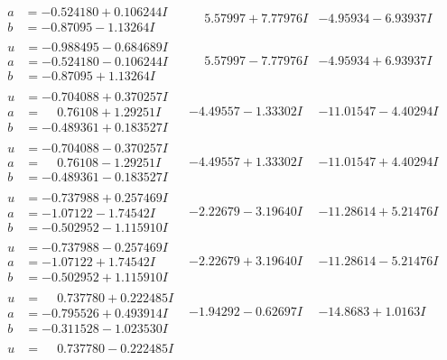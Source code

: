 \documentclass[1p]{elsarticle_modified}
\theoremstyle{definition}
\begin{document}
$$\begin{array}{c|c|c}
\begin{aligned}
a &= -0.524180 + 0.106244 I \\
b &= -0.87095 - 1.13264 I\end{aligned}
 & \phantom{-}5.57997 + 7.77976 I & -4.95934 - 6.93937 I \\ \hline\begin{aligned}
u &= -0.988495 - 0.684689 I \\
a &= -0.524180 - 0.106244 I \\
b &= -0.87095 + 1.13264 I\end{aligned}
 & \phantom{-}5.57997 - 7.77976 I & -4.95934 + 6.93937 I \\ \hline\begin{aligned}
u &= -0.704088 + 0.370257 I \\
a &= \phantom{-}0.76108 + 1.29251 I \\
b &= -0.489361 + 0.183527 I\end{aligned}
 & -4.49557 - 1.33302 I & -11.01547 - 4.40294 I \\ \hline\begin{aligned}
u &= -0.704088 - 0.370257 I \\
a &= \phantom{-}0.76108 - 1.29251 I \\
b &= -0.489361 - 0.183527 I\end{aligned}
 & -4.49557 + 1.33302 I & -11.01547 + 4.40294 I \\ \hline\begin{aligned}
u &= -0.737988 + 0.257469 I \\
a &= -1.07122 - 1.74542 I \\
b &= -0.502952 - 1.115910 I\end{aligned}
 & -2.22679 - 3.19640 I & -11.28614 + 5.21476 I \\ \hline\begin{aligned}
u &= -0.737988 - 0.257469 I \\
a &= -1.07122 + 1.74542 I \\
b &= -0.502952 + 1.115910 I\end{aligned}
 & -2.22679 + 3.19640 I & -11.28614 - 5.21476 I \\ \hline\begin{aligned}
u &= \phantom{-}0.737780 + 0.222485 I \\
a &= -0.795526 + 0.493914 I \\
b &= -0.311528 - 1.023530 I\end{aligned}
 & -1.94292 - 0.62697 I & -14.8683 + 1.0163 I \\ \hline\begin{aligned}
u &= \phantom{-}0.737780 - 0.222485 I \\

\end{aligned}
\end{array}$$
\end{document}
